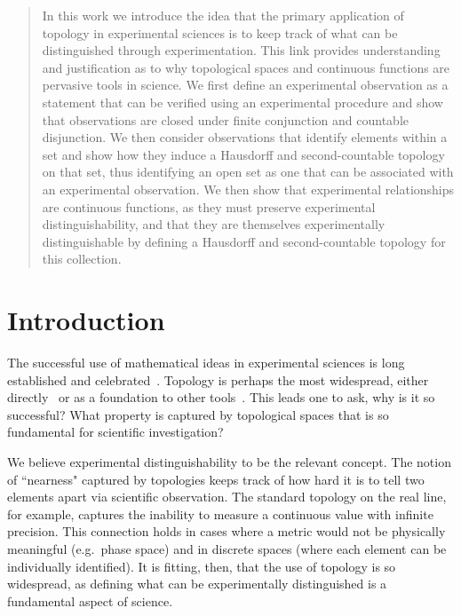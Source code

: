 \documentclass{amsart}
\theoremstyle{definition}
\numberwithin{equation}{section}
\begin{document}
\begin{abstract}
	In this work we introduce the idea that the primary application of topology in experimental sciences is to keep track of what can be distinguished through experimentation. This link provides understanding and justification as to why topological spaces and continuous functions are pervasive tools in science. We first define an experimental observation as a statement that can be verified using an experimental procedure and show that observations are closed under finite conjunction and countable disjunction. We then consider observations that identify elements within a set and show how they induce a Hausdorff and second-countable topology on that set, thus identifying an open set as one that can be associated with an experimental observation. We then show that experimental relationships are continuous functions, as they must preserve experimental distinguishability, and that they are themselves experimentally distinguishable by defining a Hausdorff and second-countable topology for this collection. 
\end{abstract}

\maketitle

\section{\bf Introduction}

The successful use of mathematical ideas in experimental sciences is long established and celebrated~\cite{wigner}. Topology is perhaps the most widespread, either directly~\cite{rashevsky, chichilnisky} or as a foundation to other tools~\cite{nakahara, basener}.  This leads one to ask, why is it so successful? What property is captured by topological spaces that is so fundamental for scientific investigation?

We believe experimental distinguishability to be the relevant concept. The notion of ``nearness" captured by topologies keeps track of how hard it is to tell two elements apart via scientific observation. The standard topology on the real line, for example, captures the inability to measure a continuous value with infinite precision. This connection holds in cases where a metric would not be physically meaningful (e.g.~phase space) and in discrete spaces (where each element can be individually identified).  It is fitting, then, that the use of topology is so widespread, as defining what can be experimentally distinguished is a fundamental aspect of science.
\end{document}

